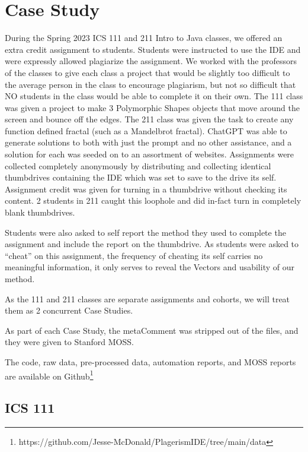 \documentclass[10pt]{article}
\newcommand{\metaComment}{metaComment\xspace}
\begin{document}
\section{Case Study}

    \label{sec:casestudy}
During the Spring 2023 ICS 111 and 211 Intro to Java classes, we offered an extra credit assignment to students.
Students were instructed to use the IDE and were expressly allowed plagiarize the assignment.  We worked with the professors of the classes to give each class a project that would be slightly too difficult to the average person in the class to encourage plagiarism, but not so difficult that NO students in the class would be able to complete it on their own.  The 111 class was given a project to make 3 Polymorphic Shapes objects that move around the screen and bounce off the edges.  The 211 class was given the task to create any function defined fractal (such as a Mandelbrot fractal).  ChatGPT was able to generate solutions to both with just the prompt and no other assistance, and a solution for each was seeded on to an assortment of websites.  Assignments were collected completely anonymously by distributing and collecting identical thumbdrives containing the IDE which was set to save to the drive its self.  Assignment credit was given for turning in a thumbdrive without checking its content.  2 students in 211 caught this loophole and did in-fact turn in completely blank thumbdrives.

Students were also asked to self report the method they used to complete the assignment and include the report on the thumbdrive.  As students were asked to ``cheat'' on this assignment, the frequency of cheating its self carries no meaningful information, it only serves to reveal the Vectors and usability of our method.

As the 111 and 211 classes are separate assignments and cohorts, we will treat them as 2 concurrent Case Studies. 

As part of each Case Study, the \metaComment was stripped out of the files, and they were given to Stanford MOSS.

The code, raw data, pre-processed data, automation reports, and MOSS reports are available on Github\footnote{https://github.com/Jesse-McDonald/PlagerismIDE/tree/main/data}
\subsection{ICS 111}
    \label{sec:casestudy111}
\end{document}
